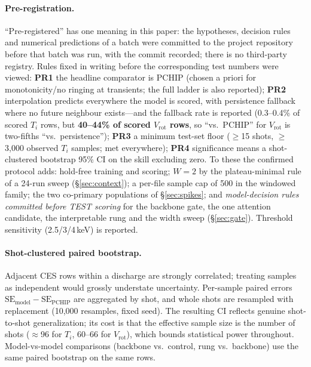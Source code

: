 \documentclass[10pt]{article}
\newcommand{\Ti}{\ensuremath{T_i}}
\newcommand{\Vrot}{\ensuremath{V_\mathrm{rot}}}
\begin{document}
\paragraph{Pre-registration.}
``Pre-registered'' has one meaning in this paper: the hypotheses, decision rules and
numerical predictions of a batch were committed to the project repository before that
batch was run, with the commit recorded; there is no third-party registry.
Rules fixed in writing before the corresponding test numbers were viewed:
\textbf{PR1} the headline comparator is PCHIP (chosen a priori for
monotonicity/no ringing at transients; the full ladder is also reported);
\textbf{PR2} interpolation predicts everywhere the model is scored, with
persistence fallback where no future neighbour exists---and the fallback rate is
reported (0.3--0.4\% of scored \Ti{} rows, but \textbf{40--44\% of scored \Vrot{}
rows}, so ``vs.\ PCHIP'' for \Vrot{} is two-fifths ``vs.\ persistence'');
\textbf{PR3} a minimum test-set floor ($\geq$15 shots, $\geq$3{,}000 observed
\Ti{} samples; met everywhere);
\textbf{PR4} significance means a shot-clustered bootstrap 95\% CI on the skill
excluding zero. To these the confirmed protocol adds: hold-free training and
scoring; $W{=}2$ by the plateau-minimal rule of a 24-run sweep
(\S\ref{sec:context}); a per-file sample cap of 500 in the windowed family; the two
co-primary populations of \S\ref{sec:spikes}; and \emph{model-decision rules
committed before TEST scoring} for the backbone gate, the one attention candidate,
the interpretable rung and the width sweep (\S\ref{sec:gate}). Threshold
sensitivity (2.5/3/4\,keV) is reported.

\paragraph{Shot-clustered paired bootstrap.}
Adjacent CES rows within a discharge are strongly correlated; treating samples as
independent would grossly understate uncertainty. Per-sample paired errors
$\mathrm{SE}_{\mathrm{model}}-\mathrm{SE}_{\mathrm{PCHIP}}$ are aggregated by
shot, and whole shots are resampled with replacement (10{,}000 resamples, fixed
seed). The resulting CI reflects genuine shot-to-shot generalization; its cost is
that the effective sample size is the number of shots ($\approx$96 for \Ti{},
60--66 for \Vrot{}), which bounds statistical power throughout. Model-vs-model
comparisons (backbone vs.\ control, rung vs.\ backbone) use the same paired
bootstrap on the same rows.
\end{document}
